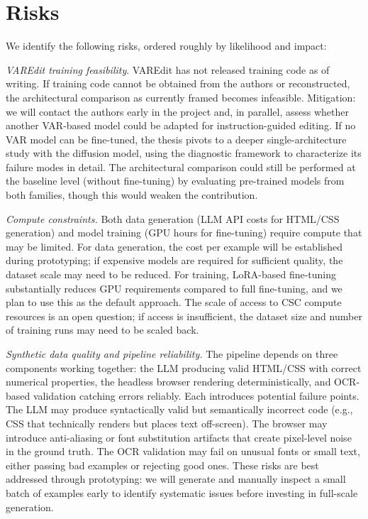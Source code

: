 \section{Risks}

\label{Risks}

We identify the following risks, ordered roughly by likelihood and impact:

\textit{VAREdit training feasibility}. VAREdit has not released training code as of writing. If training code cannot be obtained from the authors or reconstructed, the architectural comparison as currently framed becomes infeasible. Mitigation: we will contact the authors early in the project and, in parallel, assess whether another VAR-based model could be adapted for instruction-guided editing. If no VAR model can be fine-tuned, the thesis pivots to a deeper single-architecture study with the diffusion model, using the diagnostic framework to characterize its failure modes in detail. The architectural comparison could still be performed at the baseline level (without fine-tuning) by evaluating pre-trained models from both families, though this would weaken the contribution.

\textit{Compute constraints.} Both data generation (LLM API costs for HTML/CSS generation) and model training (GPU hours for fine-tuning) require compute that may be limited. For data generation, the cost per example will be established during prototyping; if expensive models are required for sufficient quality, the dataset scale may need to be reduced. For training, LoRA-based fine-tuning substantially reduces GPU requirements compared to full fine-tuning, and we plan to use this as the default approach. The scale of access to CSC compute resources is an open question; if access is insufficient, the dataset size and number of training runs may need to be scaled back.

\textit{Synthetic data quality and pipeline reliability.} The pipeline depends on three components working together: the LLM producing valid HTML/CSS with correct numerical properties, the headless browser rendering deterministically, and OCR-based validation catching errors reliably. Each introduces potential failure points. The LLM may produce syntactically valid but semantically incorrect code (e.g., CSS that technically renders but places text off-screen). The browser may introduce anti-aliasing or font substitution artifacts that create pixel-level noise in the ground truth. The OCR validation may fail on unusual fonts or small text, either passing bad examples or rejecting good ones. These risks are best addressed through prototyping: we will generate and manually inspect a small batch of examples early to identify systematic issues before investing in full-scale generation.

